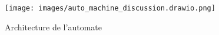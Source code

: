 \begin{figure}
\centering
\texttt{[image: images/auto\_machine\_discussion.drawio.png]}
\caption{Architecture de l'automate}
\label{fig:dia_auto_machine_discussion}
\end{figure}








